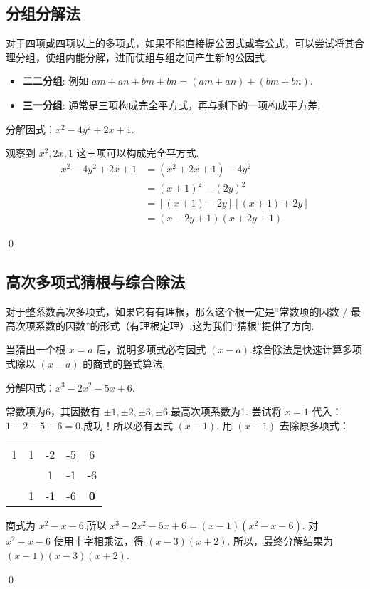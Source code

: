 	\subsection{分组分解法}
	对于四项或四项以上的多项式，如果不能直接提公因式或套公式，可以尝试将其合理分组，使组内能分解，进而使组与组之间产生新的公因式.
	\begin{itemize}
		\item \textbf{二二分组}: 例如 $am+an+bm+bn = (am+an)+(bm+bn)$.
		\item \textbf{三一分组}: 通常是三项构成完全平方式，再与剩下的一项构成平方差.
	\end{itemize}
	\begin{exercise}
		分解因式：$x^2 - 4y^2 + 2x + 1$.
	\end{exercise}
	\begin{solution}
		观察到 $x^2, 2x, 1$ 这三项可以构成完全平方式.
		\begin{align*}
			x^2 - 4y^2 + 2x + 1 &= (x^2 + 2x + 1) - 4y^2 \\
			&= (x+1)^2 - (2y)^2 \\
			&= [(x+1)-2y][(x+1)+2y] \\
			&= (x-2y+1)(x+2y+1)
		\end{align*}
	\end{solution}
	\qed
	
	\subsection{高次多项式猜根与综合除法}
	对于整系数高次多项式，如果它有有理根，那么这个根一定是“常数项的因数 / 最高次项系数的因数”的形式（有理根定理）.这为我们“猜根”提供了方向.
	\begin{definition}[综合除法]
		当猜出一个根 $x=a$ 后，说明多项式必有因式 $(x-a)$.综合除法是快速计算多项式除以 $(x-a)$ 的商式的竖式算法.
	\end{definition}
	\begin{exercise}
		分解因式：$x^3 - 2x^2 - 5x + 6$.
	\end{exercise}
	\begin{solution}
		常数项为6，其因数有 $\pm 1, \pm 2, \pm 3, \pm 6$.最高次项系数为1.
		尝试将 $x=1$ 代入：$1-2-5+6=0$.成功！所以必有因式 $(x-1)$.
		用 $(x-1)$ 去除原多项式：
		\begin{center}
			\begin{tabular}{c|cccc}
				1 & 1 & -2 & -5 & 6 \\
				&   & 1  & -1 & -6 \\
				\hline
				& 1 & -1 & -6 & \textbf{0} \\
			\end{tabular}
		\end{center}
		商式为 $x^2-x-6$.所以 $x^3 - 2x^2 - 5x + 6 = (x-1)(x^2-x-6)$.
		对 $x^2-x-6$ 使用十字相乘法，得 $(x-3)(x+2)$.
		所以，最终分解结果为 $(x-1)(x-3)(x+2)$.
	\end{solution}
	\qed
	
